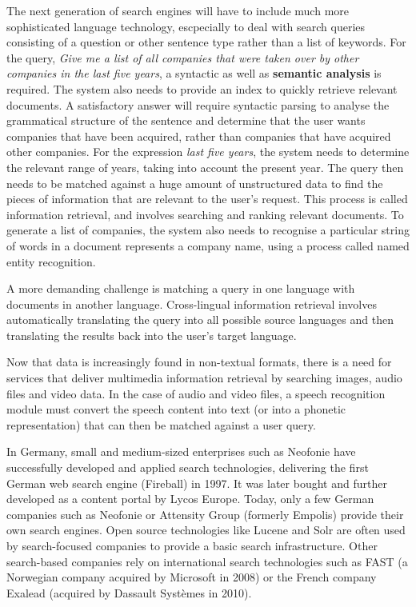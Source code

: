 \documentclass[]{../../metanetpaper}
\begin{document}
\begin{multicols}{2}

The next generation of search engines will have to include much more sophisticated language technology, escpecially to deal with search queries consisting of a question or other sentence type rather than a list of keywords. For the query, \textit{Give me a list of all companies that were taken over by other companies in the last five years}, a syntactic as well as \textbf{semantic analysis} is required. The system also needs to provide an index to quickly retrieve relevant documents. A satisfactory answer will require syntactic parsing to analyse the grammatical structure of the sentence and determine that the user wants companies that have been acquired, rather than companies that have acquired other companies. For the expression \textit{last five years}, the system needs to determine the relevant range of years, taking into account the present year. The query then needs to be matched against a huge amount of unstructured data to find the pieces of information that are relevant to the user’s request. This process is called information retrieval, and involves searching and ranking relevant documents. To generate a list of companies, the system also needs to recognise a particular string of words in a document represents a company name, using a process called named entity recognition.

A more demanding challenge is matching a query in one language with documents in another language. Cross-lingual information retrieval involves automatically translating the query into all possible source languages and then translating the results back into the user's target language.

Now that data is increasingly found in non-textual formats, there is a need for services that deliver multimedia information retrieval by searching images, audio files and video data. In the case of audio and video files, a speech recognition module must convert the speech content into text (or into a phonetic representation) that can then be matched against a user query.

In Germany, small and medium-sized enterprises such as Neofonie have successfully developed and applied search technologies, delivering the first German web search engine (Fireball) in 1997. It was later bought and further developed as a content portal by Lycos Europe. Today, only a few German companies such as Neofonie or Attensity Group (formerly Empolis) provide their own search engines. Open source technologies like Lucene and Solr are often used by search-focused companies to provide a basic search infrastructure. Other search-based companies rely on international search technologies such as FAST (a Norwegian company acquired by Microsoft in 2008) or the French company Exalead (acquired by Dassault Systèmes in 2010).


\end{multicols}
\end{document}
